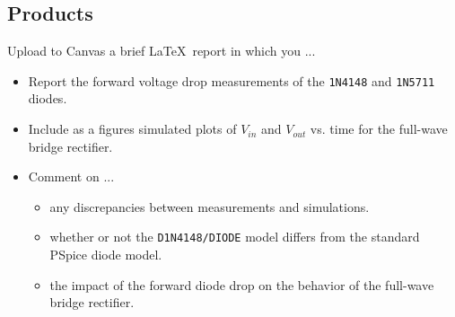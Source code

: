 \documentclass[11pt]{article}
\begin{document}
\subsection*{Products}

Upload to Canvas a brief \LaTeX\ report in which you ...
\begin{itemize}
\item Report the forward voltage drop measurements of the
  \texttt{1N4148} and \texttt{1N5711} diodes.

\item Include as a figures simulated plots of $V_{in}$
  and $V_{out}$ vs. time for the full-wave bridge rectifier.

\item Comment on ...
  \begin{itemize}
    \item any discrepancies between measurements and
      simulations.

  \item whether or not the \texttt{D1N4148/DIODE} model 
    differs from the standard PSpice diode model.

  \item the impact of the forward diode drop on the behavior
    of the full-wave bridge rectifier.
  \end{itemize}

\end{itemize}
\end{document}
